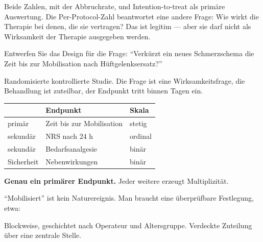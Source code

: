 \begin{aufgabe}
Beide Zahlen, mit der Abbruchrate, und Intention-to-treat als primäre Auswertung. Die Per-Protocol-Zahl beantwortet eine andere Frage: Wie wirkt die Therapie bei denen, die sie vertragen? Das ist legitim --- aber sie darf nicht als Wirksamkeit der Therapie ausgegeben werden.
\end{aufgabe}

\begin{aufgabe}
Entwerfen Sie das Design für die Frage: \enquote{Verkürzt ein neues Schmerzschema die Zeit bis zur Mobilisation nach Hüftgelenksersatz?}

\loesung
{}
Randomisierte kontrollierte Studie. Die Frage ist eine Wirksamkeitsfrage, die Behandlung ist zuteilbar, der Endpunkt tritt binnen Tagen ein.

\begin{center}
\renewcommand{\arraystretch}{1.48}
\begin{tabular}{@{}P{2.2cm}P{3.0cm}P{2.6cm}@{}}
\toprule
& \textbf{Endpunkt} & \textbf{Skala}\\
\midrule
primär & Zeit bis zur Mobilisation & stetig\\
sekundär & NRS nach 24 h & ordinal\\
sekundär & Bedarfsanalgesie & binär\\
Sicherheit & Nebenwirkungen & binär\\
\bottomrule
\end{tabular}
\end{center}

\textbf{Genau ein primärer Endpunkt.} Jeder weitere erzeugt Multiplizität.

\enquote{Mobilisiert} ist kein Naturereignis. Man braucht eine überprüfbare Festlegung, etwa: 

\begin{center}
\begin{minipage}{0.86\textwidth}
\end{minipage}
\end{center}

Blockweise, geschichtet nach Operateur und Altersgruppe. Verdeckte Zuteilung über eine zentrale Stelle.


\end{aufgabe}
